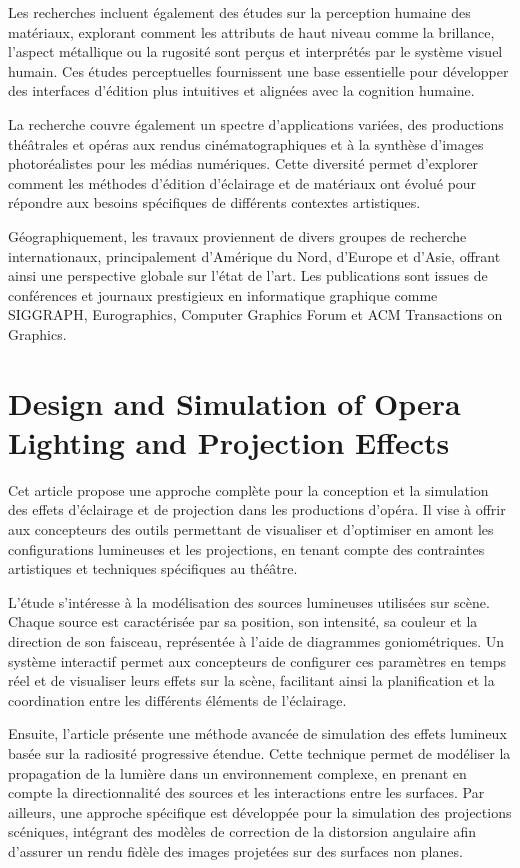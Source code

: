 \documentclass{article}
\begin{document}
Les recherches incluent également des études sur la perception humaine des matériaux, explorant comment les attributs de haut niveau comme la brillance, l'aspect métallique ou la rugosité sont perçus et interprétés par le système visuel humain. Ces études perceptuelles fournissent une base essentielle pour développer des interfaces d'édition plus intuitives et alignées avec la cognition humaine.

La recherche couvre également un spectre d'applications variées, des productions théâtrales et opéras aux rendus cinématographiques et à la synthèse d'images photoréalistes pour les médias numériques. Cette diversité permet d'explorer comment les méthodes d'édition d'éclairage et de matériaux ont évolué pour répondre aux besoins spécifiques de différents contextes artistiques.

Géographiquement, les travaux proviennent de divers groupes de recherche internationaux, principalement d'Amérique du Nord, d'Europe et d'Asie, offrant ainsi une perspective globale sur l'état de l'art. Les publications sont issues de conférences et journaux prestigieux en informatique graphique comme SIGGRAPH, Eurographics, Computer Graphics Forum et ACM Transactions on Graphics.

\section{Design and Simulation of  Opera Lighting and Projection Effects}
Cet article propose une approche complète pour la conception et la simulation des effets d’éclairage et de projection dans les productions d’opéra. 
Il vise à offrir aux concepteurs des outils permettant de visualiser et d’optimiser en amont les configurations lumineuses et les projections, en 
tenant compte des contraintes artistiques et techniques spécifiques au théâtre.

L’étude s’intéresse à la modélisation des sources lumineuses utilisées sur scène. Chaque source est caractérisée par sa position, 
son intensité, sa couleur et la direction de son faisceau, représentée à l’aide de diagrammes goniométriques. Un système interactif permet aux 
concepteurs de configurer ces paramètres en temps réel et de visualiser leurs effets sur la scène, facilitant ainsi la planification et 
la coordination entre les différents éléments de l’éclairage.

Ensuite, l’article présente une méthode avancée de simulation des effets lumineux basée sur la radiosité progressive étendue.
Cette technique permet de modéliser la propagation de la lumière dans un environnement complexe, en prenant en compte la directionnalité 
des sources et les interactions entre les surfaces. Par ailleurs, une approche spécifique est développée pour la simulation des projections 
scéniques, intégrant des modèles de correction de la distorsion angulaire afin d’assurer un rendu fidèle des images projetées sur des surfaces 
non planes.
\end{document}
